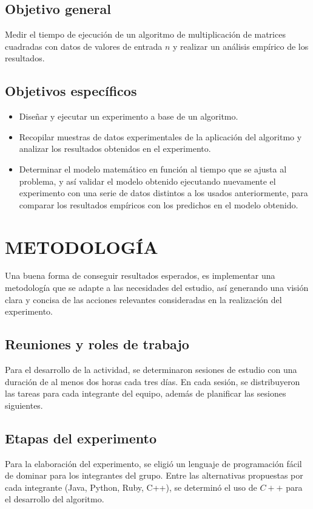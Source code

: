 \documentclass[11pt, twocolumn]{llncs}
\begin{document}
\subsection{Objetivo general}
Medir el tiempo de ejecución de un algoritmo de multiplicación de matrices cuadradas con datos de valores de entrada $n$ y realizar un análisis empírico de los resultados.

\subsection{Objetivos específicos}
\begin{itemize}
    \item Diseñar y ejecutar un experimento a base de un algoritmo.
    \item Recopilar muestras de datos experimentales de la aplicación del algoritmo y analizar los resultados obtenidos en el experimento.
    \item Determinar el modelo matemático en función al tiempo que se ajusta al problema, y así validar el modelo obtenido ejecutando nuevamente el experimento con una serie de datos distintos a los usados anteriormente, para comparar los resultados empíricos con los predichos en el modelo obtenido.
\end{itemize}

\section{METODOLOGÍA}\label{metodología}
Una buena forma de conseguir resultados esperados, es implementar una metodología que se adapte a las necesidades del estudio, así generando una visión clara y concisa de las acciones relevantes consideradas en la realización del experimento.

\subsection{Reuniones y roles de trabajo}
Para el desarrollo de la actividad, se determinaron sesiones de estudio con una duración de al menos dos horas cada tres días. En cada sesión, se distribuyeron las tareas para cada integrante del equipo, además de planificar las sesiones siguientes.

\subsection{Etapas del experimento}
Para la elaboración del experimento, se eligió un lenguaje de programación fácil de dominar para los integrantes del grupo. Entre las alternativas propuestas por cada integrante (Java, Python, Ruby, C++), se determinó el uso de $C++$ para el desarrollo del algoritmo.
\end{document}
